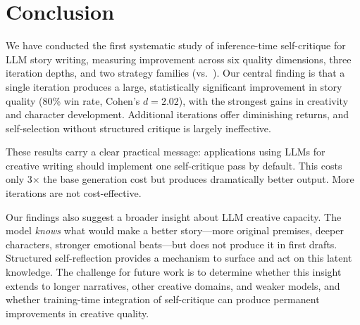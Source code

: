 \section{Conclusion}
\label{sec:conclusion}

We have conducted the first systematic study of inference-time self-critique for LLM story writing, measuring improvement across six quality dimensions, three iteration depths, and two strategy families (\selfrefine vs.\ \bestofn).
Our central finding is that a single \critiquerevise iteration produces a large, statistically significant improvement in story quality (80\% win rate, Cohen's $d = 2.02$), with the strongest gains in creativity and character development.
Additional iterations offer diminishing returns, and self-selection without structured critique is largely ineffective.

These results carry a clear practical message: applications using LLMs for creative writing should implement one self-critique pass by default.
This costs only 3$\times$ the base generation cost but produces dramatically better output.
More iterations are not cost-effective.

Our findings also suggest a broader insight about LLM creative capacity.
The model \emph{knows} what would make a better story---more original premises, deeper characters, stronger emotional beats---but does not produce it in first drafts.
Structured self-reflection provides a mechanism to surface and act on this latent knowledge.
The challenge for future work is to determine whether this insight extends to longer narratives, other creative domains, and weaker models, and whether training-time integration of self-critique can produce permanent improvements in creative quality.
